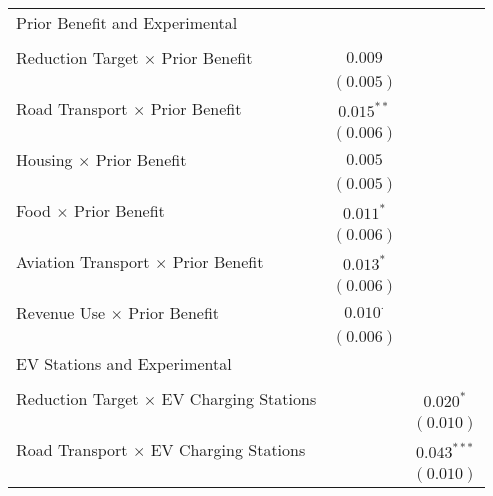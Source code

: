 \begin{center}
\begin{tiny}
\begin{longtable}{l@{} c@{} c@{}}
Prior Benefit and Experimental                         &                 &                \\
                                                       &                 &                \\
\quad Reduction Target $\times$ Prior Benefit          & $0.009$         &                \\
                                                       & $(0.005)$       &                \\
\quad Road Transport $\times$ Prior Benefit            & $0.015^{**}$    &                \\
                                                       & $(0.006)$       &                \\
\quad Housing $\times$ Prior Benefit                   & $0.005$         &                \\
                                                       & $(0.005)$       &                \\
\quad Food $\times$ Prior Benefit                      & $0.011^{*}$     &                \\
                                                       & $(0.006)$       &                \\
\quad Aviation Transport $\times$ Prior Benefit        & $0.013^{*}$     &                \\
                                                       & $(0.006)$       &                \\
\quad Revenue Use $\times$ Prior Benefit               & $0.010^{\cdot}$ &                \\
                                                       & $(0.006)$       &                \\
EV Stations and Experimental                           &                 &                \\
                                                       &                 &                \\
\quad Reduction Target $\times$ EV Charging Stations   &                 & $0.020^{*}$    \\
                                                       &                 & $(0.010)$      \\
\quad Road Transport $\times$ EV Charging Stations     &                 & $0.043^{***}$  \\
                                                       &                 & $(0.010)$      \\

\end{longtable}
\end{tiny}
\end{center}
